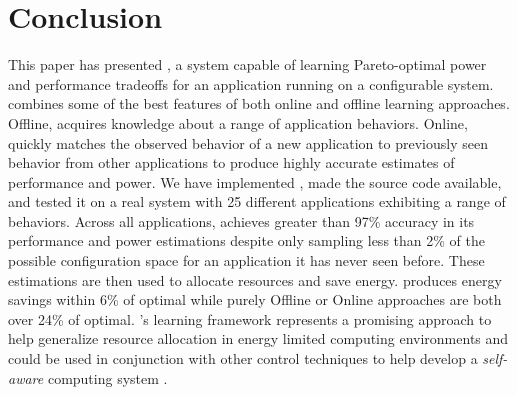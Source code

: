 \section{Conclusion}
\label{sec:conclusion}
\balance
This paper has presented \SYSTEM{}, a system capable of learning
Pareto-optimal power and performance tradeoffs for an application
running on a configurable system.  \SYSTEM{} combines some of the best
features of both online and offline learning approaches.  Offline,
\SYSTEM{} acquires knowledge about a range of application behaviors.
Online, \SYSTEM{} quickly matches the observed behavior of a new
application to previously seen behavior from other applications to
produce highly accurate estimates of performance and power.  We have
implemented \SYSTEM{}, made the source code available, and tested it
on a real system with 25 different applications exhibiting a range of
behaviors.  Across all applications, \SYSTEM{} achieves greater than
97\% accuracy in its performance and power estimations despite only
sampling less than 2\% of the possible configuration space for an
application it has never seen before.  These estimations are then used
to allocate resources and save energy.  \SYSTEM{} produces energy
savings within 6\% of optimal while purely Offline or Online
approaches are both over 24\% of optimal.  \SYSTEM{}'s learning
framework represents a promising approach to help generalize resource
allocation in energy limited computing environments and could be used
in conjunction with other control techniques to help develop a
\emph{self-aware} computing system
\cite{Hoffmann2012,1508273,1333571,1516538,Kephardt2005,laddaga1999}.
